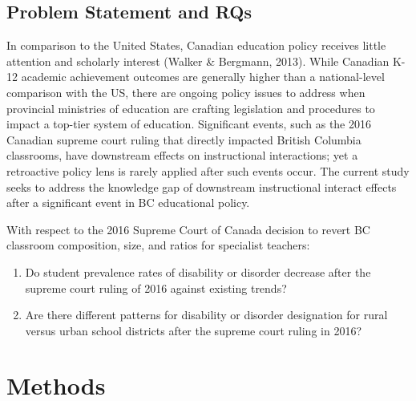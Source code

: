 \documentclass[
  english,
  man,floatsintext]{apa6}
\begin{document}
\hypertarget{problem-statement-and-rqs}{%
\subsection{Problem Statement and RQs}\label{problem-statement-and-rqs}}

In comparison to the United States, Canadian education policy receives little attention and scholarly interest (Walker \& Bergmann, 2013). While Canadian K-12 academic achievement outcomes are generally higher than a national-level comparison with the US, there are ongoing policy issues to address when provincial ministries of education are crafting legislation and procedures to impact a top-tier system of education. Significant events, such as the 2016 Canadian supreme court ruling that directly impacted British Columbia classrooms, have downstream effects on instructional interactions; yet a retroactive policy lens is rarely applied after such events occur. The current study seeks to address the knowledge gap of downstream instructional interact effects after a significant event in BC educational policy.

With respect to the 2016 Supreme Court of Canada decision to revert BC classroom composition, size, and ratios for specialist teachers:

\begin{enumerate}
  \item Do student prevalence rates of disability or disorder decrease after the supreme court ruling of 2016 against existing trends?
  \item Are there different patterns for disability or disorder designation for rural versus urban school districts after the supreme court ruling in 2016?
 \end{enumerate}

\hypertarget{methods}{%
\section{Methods}\label{methods}}
\end{document}

